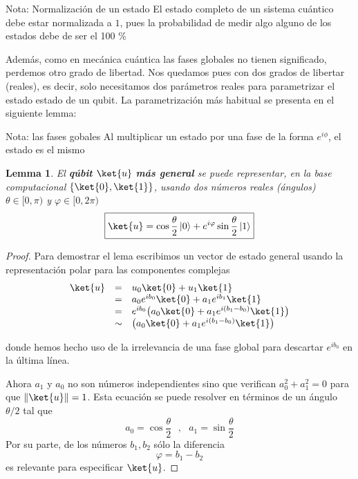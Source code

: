 \documentclass[a4paper,11pt]{book} %
\newtheorem{lemma_contador}{Lemma}
\newcommand{\Lemma}[1]{
		\begin{mybox_gray2}{}
			\begin{lemma_contador}
				 #1 
			\end{lemma_contador} 
		\end{mybox_gray2}
	}
\numberwithin{equation}{chapter}
\begin{document}
\begin{mybox_blue}{Nota: Normalización de un estado}
El estado completo de un sistema cuántico debe estar normalizada a $1$, pues la probabilidad de medir algo alguno de los estados debe de ser el 100 \%
\end{mybox_blue}

Además, como en mecánica cuántica las fases globales no tienen significado, perdemos otro grado de libertad. Nos quedamos pues con dos grados de libertar (reales), es decir, solo necesitamos dos parámetros reales para parametrizar el estado estado de un qubit. La parametrización más habitual se presenta en el siguiente lemma:

\begin{mybox_blue}{Nota: las fases gobales}
Al multiplicar un estado por una fase de la forma $e^{i \phi}$, el estado es el mismo
\end{mybox_blue}


	\Lemma{
	El \textbf{qúbit} $\ket{u}$  \textbf{más general} se puede representar, en la base computacional 
	$\{\ket{0},\ket{1}\}$, usando dos números reales (ángulos) $\theta\in [0,\pi)$ y $\varphi\in [0,2\pi)$   
	\begin{equation} \label{ec_qubit_caso_general}
	\boxed{\ket{u} = \cos{\frac{\theta}{2}}\, |0\rangle + e^{i\varphi}\sin{\frac{\theta}{2}}\,|1\rangle }
	\end{equation}
	}

	\begin{proof}
	Para demostrar el lema escribimos un vector de estado general usando la representación polar para 
	las componentes complejas
    \begin{equation}
	\begin{array}{rcl}
	\ket{u} &=& u_0\ket{0} + u_1\ket{1} \\
	&=& a_0 e^{i b_0}\ket{0} + a_1 e^{ib_1}\ket{1}\\
	&=& e^{i b_0}\big(a_0 \ket{0} + a_1 e^{i(b_1-b_0)}\ket{1}\big)\\
	&\sim & \big( a_0 \ket{0} + a_1 e^{i(b_1-b_0)}\ket{1} \big)
	\end{array}
	\end{equation}
    
	donde hemos hecho uso de la irrelevancia de una fase global para descartar $e^{i b_0}$ en la última línea.

	Ahora $a_1$ y $a_0$ no son números independientes sino que verifican $a_0^2 + a_1^2 = 0$ para que 
	$\|\ket{u}\|=1$. Esta ecuación se puede resolver en términos de un ángulo $\theta/2$ tal que
	\begin{equation}
	a_0 = \cos\frac{\theta}{2}~~~,~~~ a_1 = \sin\frac{\theta}{2} 
	\end{equation}
	Por su parte, de los números $b_1, b_2$ sólo la diferencia
	\begin{equation}
	\varphi = b_1-b_2
	\end{equation}
	es relevante para especificar $\ket{u}$. 
	\end{proof}
  
\end{document}
